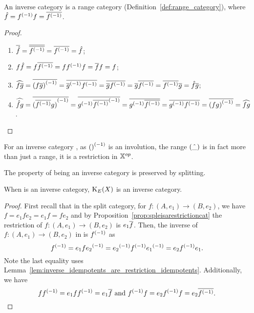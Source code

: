 \begin{lemma}\label{lem:inverse_categories_are_range_categories}
  An inverse category \X is a range category (Definition~\ref{def:range_category}), where
  $\hat{f} = {f}^{(-1)}f = \overline{{f}^{(-1)}}$.
\end{lemma}
\begin{proof}
  \prepprooflist
  \begin{enumerate}
    \item[\rrone] $\overline{\hat{f}} = \overline{\overline{{f}^{(-1)}}} = \overline{{f}^{(-1)}} = \hat{f}$;
    \item[\rrtwo] $f \hat{f} = f \overline{{f}^{(-1)}} = f {f}^{(-1)} f = \overline{f} f = f$;
    \item[\rrthree] $\widehat{f\overline{g}} = \overline{{(f\overline{g})}^{(-1)}} = \overline{{\overline{g}}^{(-1)} {f}^{(-1)}} =
      \overline{\overline{g} {f}^{(-1)}} =
      \overline{g} \overline{{f}^{(-1)}} = \overline{{f}^{(-1)}} \overline{g} =\hat{f} \overline{g}$;
    \item[\rrfour]  $\widehat{\hat{f}g} = \overline{{(\overline{{f}^{(-1)}} g)}^{(-1)}} =
      \overline{{g}^{(-1)}{\overline{{f}^{(-1)}}}^{(-1)}} = \overline{{g}^{(-1)} \overline{{f}^{(-1)}}} =
      \overline{{g}^{(-1)} {f}^{(-1)}} = \overline{{(f g)}^{(-1)}} = \widehat{f g}$.
  \end{enumerate}
\end{proof}

For an inverse category \X, as ${()}^{(-1)}$ is an involution, the range $(\hat{\_})$ is in fact more
than just a range, it is a restriction in ${\mathbb{X}}^{op}$.

The property of being an inverse category is preserved by splitting.

\begin{lemma}\label{lem:the_idempotent_splitting_of_an_inverse_category_is_an_inverse_category}
  When \X is an inverse category, $\text{K}_{E}(X)$ is an inverse category.
\end{lemma}
\begin{proof}
  First recall that in the split category, for  $f:(A,e_1)\to(B,e_2)$, we have
  $f = e_1 f e_2 = e_1 f = f e_2$ and  by Proposition~\ref{prop:spleisarestrictioncat}  the
  restriction of  $f:(A,e_1)\to(B,e_2)$ is $e_1\overline{f}$. Then, the inverse of
  $f:(A,e_1)\to(B,e_2)$   in   is ${f}^{(-1)}$ as
  \[
    {f}^{(-1)} = {e_1 f e_2}^{(-1)} = {e_2}^{(-1)} {f}^{(-1)} {e_1}^{(-1)} = e_2 {f}^{(-1)} e_1.
  \]
  Note the last equality uses
  Lemma~\ref{lem:inverse_idempotents_are_restriction_idempotents}. Additionally, we have
  \[
    f {f}^{(-1)}
    = e_1 f {f}^{(-1)} = e_1 \overline{f}
    \text{ and }
    {f}^{(-1)} f =
    e_2 {f}^{(-1)} f
    = e_2 \overline{{f}^{(-1)}}.
  \]

\end{proof}

